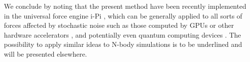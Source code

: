 We conclude by noting that the present method have been recently implemented in the universal force engine i-Pi \cite{iPi}, which can be generally applied to all sorts of forces affected by stochastic noise such as those computed by GPUs or other hardware accelerators \cite{HOOMD, NAMD, OpenMM, HalMD, Lammps, Amber, Gromacs}, and potentially even quantum computing devices \cite{Steane, Knill, Blatt, Chow}. The possibility to apply similar ideas to N-body simulations \cite{White, Makino} is to be underlined and will be presented elsewhere. 